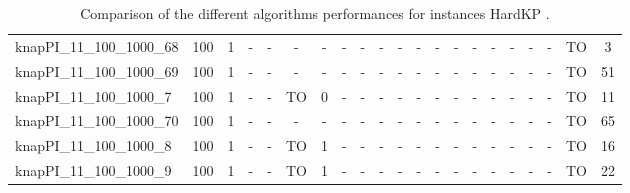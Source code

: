\begin{sidewaystable}[!ht]
{\begin{tabular}{lcccccccccccccccccccc}
knapPI\_11\_100\_1000\_68 & 100 & 1 &  - &  - &  - &  - &  - &  - &  - &  - &  - &  - &  - &  - &  - &  - &  - &  - & TO & 3 \\
knapPI\_11\_100\_1000\_69 & 100 & 1 &  - &  - &  - &  - &  - &  - &  - &  - &  - &  - &  - &  - &  - &  - &  - &  - & TO & 51 \\
knapPI\_11\_100\_1000\_7 & 100 & 1 &  - &  - & TO & 0 &  - &  - &  - &  - &  - &  - &  - &  - &  - &  - &  - &  - & TO & 11 \\
knapPI\_11\_100\_1000\_70 & 100 & 1 &  - &  - &  - &  - &  - &  - &  - &  - &  - &  - &  - &  - &  - &  - &  - &  - & TO & 65 \\
knapPI\_11\_100\_1000\_8 & 100 & 1 &  - &  - & TO & 1 &  - &  - &  - &  - &  - &  - &  - &  - &  - &  - &  - &  - & TO & 16 \\
knapPI\_11\_100\_1000\_9 & 100 & 1 &  - &  - & TO & 1 &  - &  - &  - &  - &  - &  - &  - &  - &  - &  - &  - &  - & TO & 22 \\
\bottomrule
\end{tabular}
}%
\caption{Comparison of the different algorithms performances for instances HardKP .}
\label{tab:table_compare_HardKP }
\end{sidewaystable}
